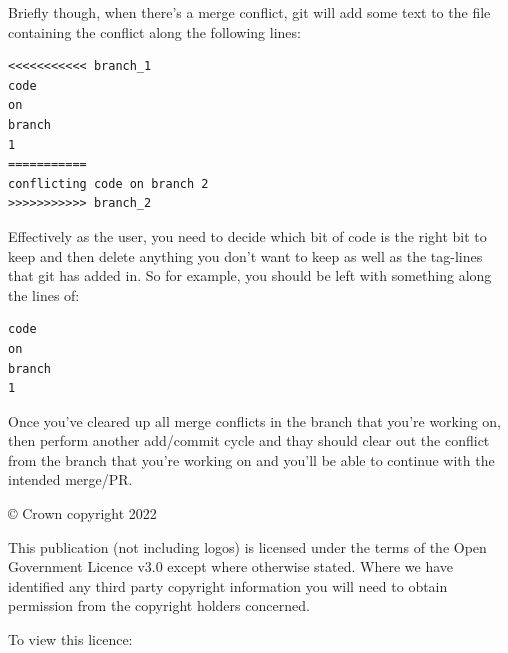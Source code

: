 \documentclass[
  12pt,
]{article}
\begin{document}
Briefly though, when there's a merge conflict, git will add some text to
the file containing the conflict along the following lines:

\begin{verbatim}
<<<<<<<<<<< branch_1
code 
on 
branch 
1
===========
conflicting code on branch 2
>>>>>>>>>>> branch_2
\end{verbatim}

Effectively as the user, you need to decide which bit of code is the
right bit to keep and then delete anything you don't want to keep as
well as the tag-lines that git has added in. So for example, you should
be left with something along the lines of:

\begin{verbatim}
code 
on 
branch 
1
\end{verbatim}

Once you've cleared up all merge conflicts in the branch that you're
working on, then perform another add/commit cycle and thay should clear
out the conflict from the branch that you're working on and you'll be
able to continue with the intended merge/PR.

\newpage

\vspace*{\fill}
\color{black}

© Crown copyright 2022

This publication (not including logos) is licensed under the terms of
the Open Government Licence v3.0 except where otherwise stated. Where we
have identified any third party copyright information you will need to
obtain permission from the copyright holders concerned.

To view this licence:
\end{document}
